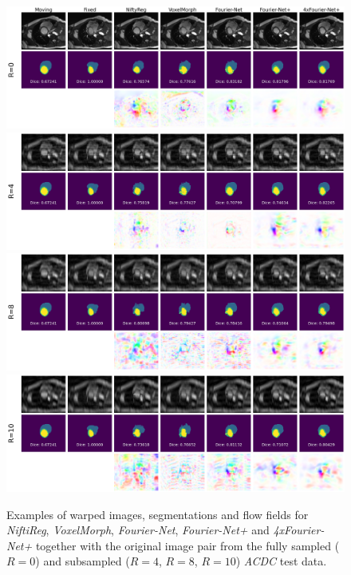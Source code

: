 \begin{figure}[H]
	\centering
	\graphicspath{{images/}{\main/images/}}
	\includegraphics[width=\textwidth]{TestExamples_Mode0.png}
    	\includegraphics[width=\textwidth]{TestExamples_Mode1.png}
    	\includegraphics[width=\textwidth]{TestExamples_Mode2.png}
    	\includegraphics[width=\textwidth]{TestExamples_Mode3.png}	
	\caption{Examples of warped images, segmentations and flow fields for \emph{NiftiReg}, \emph{VoxelMorph}, \emph{Fourier-Net}, \emph{Fourier-Net+} and \emph{4xFourier-Net+} together with the original image pair from the fully sampled ($R=0$) and subsampled ($R=4$, $R=8$, $R=10$) \emph{ACDC} test data.}
	\label{fig:TestExamples}
\end{figure}


